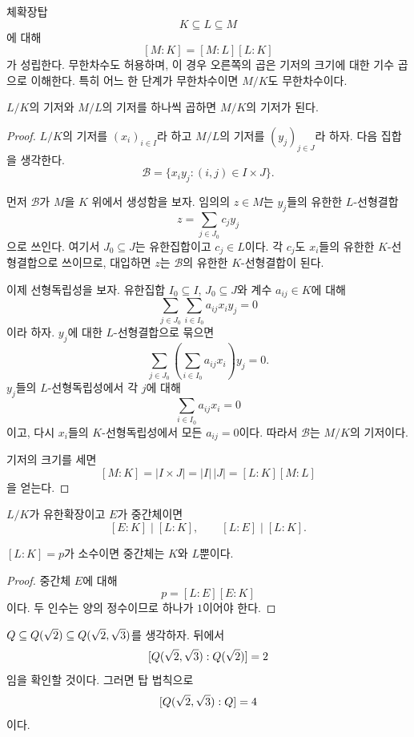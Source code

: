 \begin{theorem}[탑 법칙]
체확장탑
\[
  K\subseteq L\subseteq M
\]
에 대해
\[
  [M:K]=[M:L][L:K]
\]
가 성립한다. 무한차수도 허용하며, 이 경우 오른쪽의 곱은 기저의 크기에 대한 기수 곱으로 이해한다. 특히 어느 한 단계가 무한차수이면 $M/K$도 무한차수이다.
\end{theorem}

\begin{proofidea}
$L/K$의 기저와 $M/L$의 기저를 하나씩 곱하면 $M/K$의 기저가 된다.
\end{proofidea}

\begin{proof}
$L/K$의 기저를 $(x_i)_{i\in I}$라 하고 $M/L$의 기저를 $(y_j)_{j\in J}$라 하자. 다음 집합을 생각한다.
\[
  \mathcal B=\{x_i y_j:(i,j)\in I\times J\}.
\]

먼저 $\mathcal B$가 $M$을 $K$ 위에서 생성함을 보자. 임의의 $z\in M$는 $y_j$들의 유한한 $L$-선형결합
\[
  z=\sum_{j\in J_0}c_jy_j
\]
으로 쓰인다. 여기서 $J_0\subseteq J$는 유한집합이고 $c_j\in L$이다. 각 $c_j$도 $x_i$들의 유한한 $K$-선형결합으로 쓰이므로, 대입하면 $z$는 $\mathcal B$의 유한한 $K$-선형결합이 된다.

이제 선형독립성을 보자. 유한집합 $I_0\subseteq I$, $J_0\subseteq J$와 계수 $a_{ij}\in K$에 대해
\[
  \sum_{j\in J_0}\sum_{i\in I_0}a_{ij}x_i y_j=0
\]
이라 하자. $y_j$에 대한 $L$-선형결합으로 묶으면
\[
  \sum_{j\in J_0}\left(\sum_{i\in I_0}a_{ij}x_i\right)y_j=0.
\]
$y_j$들의 $L$-선형독립성에서 각 $j$에 대해
\[
  \sum_{i\in I_0}a_{ij}x_i=0
\]
이고, 다시 $x_i$들의 $K$-선형독립성에서 모든 $a_{ij}=0$이다. 따라서 $\mathcal B$는 $M/K$의 기저이다.

기저의 크기를 세면
\[
  [M:K]=|I\times J|=|I|\,|J|=[L:K][M:L]
\]
을 얻는다.
\end{proof}

\begin{corollary}
$L/K$가 유한확장이고 $E$가 중간체이면
\[
  [E:K]\mid[L:K],
  \qquad
  [L:E]\mid[L:K].
\]
\end{corollary}

\begin{corollary}[소수 차수 확장]
$[L:K]=p$가 소수이면 중간체는 $K$와 $L$뿐이다.
\end{corollary}

\begin{proof}
중간체 $E$에 대해
\[
  p=[L:E][E:K]
\]
이다. 두 인수는 양의 정수이므로 하나가 $1$이어야 한다.
\end{proof}

\begin{example}
$Q\subseteq Q(\sqrt2)\subseteq Q(\sqrt2,\sqrt3)$를 생각하자. 뒤에서
\[
  [Q(\sqrt2,\sqrt3):Q(\sqrt2)]=2
\]
임을 확인할 것이다. 그러면 탑 법칙으로
\[
  [Q(\sqrt2,\sqrt3):Q]=4
\]
이다.
\end{example}

